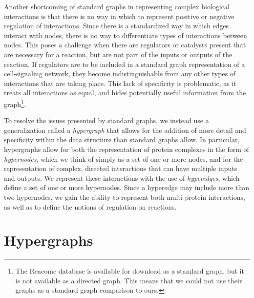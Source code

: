 \documentclass[12pt,twoside]{reedthesis}
\theoremstyle{definition}
\begin{document}
Another shortcoming of standard graphs in representing complex biological interactions is that there is no way in which to represent positive or negative regulation of interactions.  Since there is a standardized way in which edges interact with nodes, there is no way to differentiate types of interactions between nodes.  This poses a challenge when there are regulators or catalysts present that are necessary for a reaction, but are not part of the inputs or outputs of the reaction.  If regulators are to be included in a standard graph representation of a cell-signaling network, they become indistinguishable from any other types of interactions that are taking place.  This lack of specificity is problematic, as it treats all interactions as equal, and hides potentially useful information from the graph\footnote{The Reacome database is available for download as a standard graph, but it is not available as a directed graph. This means that we could not use their graphs as a standard graph comparison to ours.}.\par

To resolve the issues presented by standard graphs, we instead use a generalization called a \textit{hypergraph} that allows for the addition of more detail  and specificity within the data structure than standard graphs allow.  In particular, hypergraphs allow for both the representation of protein complexes in the form of \textit{hypernodes}, which we think of simply as a set of one or more nodes, and for the representation of complex, directed interactions that can have multiple inputs and outputs.  We represent these interactions with the use of \textit{hyperedges}, which define a set of one or more hypernodes.  Since a hyperedge may include more than two hypernodes, we gain the ability to represent both multi-protein interactions, as well as to define the notions of regulation on reactions.\par

\section{Hypergraphs}
\end{document}

